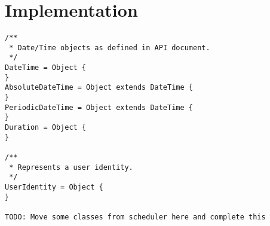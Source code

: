 
\section{Implementation}

\CodeStyle{}
\CodeStyleAppendLanguage

\begin{lstlisting}
/**
 * Date/Time objects as defined in API document.
 */
DateTime = Object {
}
AbsoluteDateTime = Object extends DateTime {
}
PeriodicDateTime = Object extends DateTime {
}
Duration = Object {
}

/** 
 * Represents a user identity.
 */
UserIdentity = Object {
}

TODO: Move some classes from scheduler here and complete this
\end{lstlisting}